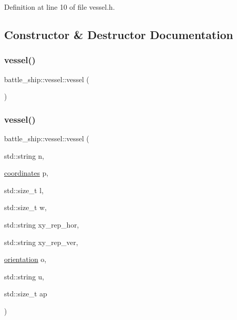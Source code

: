 Definition at line 10 of file vessel.\+h.



\subsection{Constructor \& Destructor Documentation}
\mbox{\label{classbattle__ship_1_1vessel_a6f3be9c2343940c262fb7add97402311}} 
\subsubsection{\texorpdfstring{vessel()}{vessel()}\hspace{0.1cm}{\footnotesize\ttfamily [1/2]}}
{\footnotesize\ttfamily battle\+\_\+ship\+::vessel\+::vessel (\begin{DoxyParamCaption}{ }\end{DoxyParamCaption})\hspace{0.3cm}{\ttfamily [default]}}

\mbox{\label{classbattle__ship_1_1vessel_a56fb6c51c60a66f2a85be6081f081388}} 
\subsubsection{\texorpdfstring{vessel()}{vessel()}\hspace{0.1cm}{\footnotesize\ttfamily [2/2]}}
{\footnotesize\ttfamily battle\+\_\+ship\+::vessel\+::vessel (\begin{DoxyParamCaption}\item[{std\+::string}]{n,  }\item[{\hyperlink{structbattle__ship_1_1coordinates}{coordinates}}]{p,  }\item[{std\+::size\+\_\+t}]{l,  }\item[{std\+::size\+\_\+t}]{w,  }\item[{std\+::string}]{xy\+\_\+rep\+\_\+hor,  }\item[{std\+::string}]{xy\+\_\+rep\+\_\+ver,  }\item[{\hyperlink{namespacebattle__ship_aed87488f0a73f0d0679fe343fb61c784}{orientation}}]{o,  }\item[{std\+::string}]{u,  }\item[{std\+::size\+\_\+t}]{ap }\end{DoxyParamCaption})}

